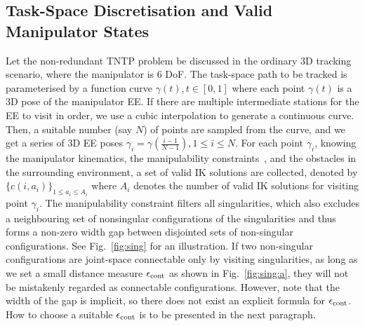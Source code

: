 \documentclass[letterpaper, 10 pt, journal, twoside]{ieeetran}  %
\begin{document}
\subsection{Task-Space Discretisation and Valid Manipulator States}
Let the non-redundant TNTP problem be discussed in the ordinary 3D tracking scenario, where the manipulator is 6 DoF. 
The task-space path to be tracked is parameterised by a function curve $\gamma(t), t\in [0, 1]$ where each point $\gamma(t)$ is a 3D pose of the manipulator EE. 
If there are multiple intermediate stations for the EE to visit in order, we use a cubic interpolation to generate a continuous curve. 
Then, a suitable number (say $N$) of points are sampled from the curve, and we get a series of 3D EE poses $\gamma_i = \gamma(\frac{i-1}{N-1}), 1\leq i\leq N$. 
For each point $\gamma_i$, knowing the manipulator kinematics, the manipulability constraints~\cite{yoshikawa1990translational}, and the obstacles in the surrounding environment, a set of valid IK solutions are collected, denoted by $\{c(i, a_i)\}_{1\leq a_i\leq A_i}$ where $A_i$ denotes the number of valid IK solutions for visiting point $\gamma_i$. 
The manipulability constraint filters all singularities, which also excludes a neighbouring set of nonsingular configurations of the singularities and thus forms a non-zero width gap between disjointed sets of non-singular configurations. 
See Fig.~\ref{fig:sing} for an illustration.
If two non-singular configurations are joint-space connectable only by visiting singularities, as long as we set a small distance measure $\epsilon_{\rm cont}$ as shown in Fig.~\ref{fig:sing:a}, they will not be mistakenly regarded as connectable configurations. 
However, note that the width of the gap is implicit, so there does not exist an explicit formula for $\epsilon_{\rm cont}$. How to choose a suitable $\epsilon_{\rm cont}$ is to be presented in the next paragraph. 
\end{document}
